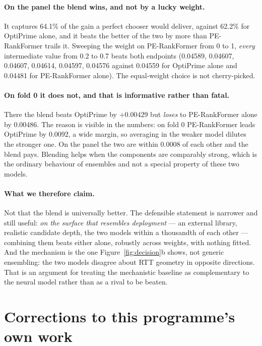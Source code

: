\documentclass[11pt]{article}
\begin{document}
\paragraph{On the panel the blend wins, and not by a lucky weight.}
It captures 64.1\% of the gain a perfect chooser would deliver, against 62.2\% for OptiPrime
alone, and it beats the better of the two by more than PE-RankFormer trails it. Sweeping the
weight on PE-RankFormer from 0 to 1, \emph{every} intermediate value from 0.2 to 0.7 beats
both endpoints (0.04589, 0.04607, 0.04607, 0.04614, 0.04597, 0.04576 against 0.04559 for
OptiPrime alone and 0.04481 for PE-RankFormer alone). The equal-weight choice is not
cherry-picked.

\paragraph{On fold 0 it does not, and that is informative rather than fatal.}
There the blend beats OptiPrime by $+0.00429$ but \emph{loses} to PE-RankFormer alone by
$0.00486$. The reason is visible in the numbers: on fold 0 PE-RankFormer leads OptiPrime by
0.0092, a wide margin, so averaging in the weaker model dilutes the stronger one. On the
panel the two are within 0.0008 of each other and the blend pays. Blending helps when the
components are comparably strong, which is the ordinary behaviour of ensembles and not a
special property of these two models.

\paragraph{What we therefore claim.}
Not that the blend is universally better. The defensible statement is narrower and still
useful: \emph{on the surface that resembles deployment} --- an external library, realistic
candidate depth, the two models within a thousandth of each other --- combining them beats
either alone, robustly across weights, with nothing fitted. And the mechanism is the one
Figure~\ref{fig:decision}b shows, not generic ensembling: the two models disagree about RTT
geometry in opposite directions. That is an argument for treating the mechanistic baseline as
complementary to the neural model rather than as a rival to be beaten.

\section{Corrections to this programme's own work}
\label{sec:corrections}
\end{document}
